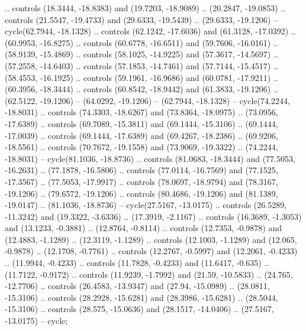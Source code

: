 {  .. controls (18.3444, -18.8383) and (19.7203, -18.9089) .. (20.2847, -19.0853)
  .. controls (21.5547, -19.4733) and (29.6333, -19.5439) .. (29.6333, -19.1206)
  -- cycle(62.7944, -18.1328)
  .. controls (62.1242, -17.6036) and (61.3128, -17.0392) .. (60.9953, -16.8275)
  .. controls (60.6778, -16.6511) and (59.7606, -16.0161) .. (58.9139, -15.4869)
  .. controls (58.1025, -14.9225) and (57.3617, -14.5697) .. (57.2558, -14.6403)
  .. controls (57.1853, -14.7461) and (57.7144, -15.4517) .. (58.4553, -16.1925)
  .. controls (59.1961, -16.9686) and (60.0781, -17.9211) .. (60.3956, -18.3444)
  .. controls (60.8542, -18.9442) and (61.3833, -19.1206) .. (62.5122, -19.1206)
  -- (64.0292, -19.1206)
  -- (62.7944, -18.1328)
  -- cycle(74.2244, -18.8031)
  .. controls (74.3303, -18.6267) and (73.8364, -18.0975) .. (73.0956, -17.6389)
  .. controls (69.7089, -15.3811) and (69.1444, -15.3106) .. (69.1444, -17.0039)
  .. controls (69.1444, -17.6389) and (69.4267, -18.2386) .. (69.9206, -18.5561)
  .. controls (70.7672, -19.1558) and (73.9069, -19.3322) .. (74.2244, -18.8031)
  -- cycle(81.1036, -18.8736)
  .. controls (81.0683, -18.3444) and (77.5053, -16.2631) .. (77.1878, -16.5806)
  .. controls (77.0114, -16.7569) and (77.1525, -17.3567) .. (77.5053, -17.9917)
  .. controls (78.0697, -18.9794) and (78.3167, -19.1206) .. (79.6572, -19.1206)
  .. controls (80.4686, -19.1206) and (81.1389, -19.0147) .. (81.1036, -18.8736)
  -- cycle(27.5167, -13.0175)
  .. controls (26.5289, -11.3242) and (19.3322, -3.6336) .. (17.3919, -2.1167)
  .. controls (16.3689, -1.3053) and (13.1233, -0.3881) .. (12.8764, -0.8114)
  .. controls (12.7353, -0.9878) and (12.4883, -1.1289) .. (12.3119, -1.1289)
  .. controls (12.1003, -1.1289) and (12.065, -0.9878) .. (12.1708, -0.7761)
  .. controls (12.2767, -0.5997) and (12.2061, -0.4233) .. (11.9944, -0.4233)
  .. controls (11.7828, -0.4233) and (11.6417, -0.635) .. (11.7122, -0.9172)
  .. controls (11.9239, -1.7992) and (21.59, -10.5833) .. (24.765, -12.7706)
  .. controls (26.4583, -13.9347) and (27.94, -15.0989) .. (28.0811, -15.3106)
  .. controls (28.2928, -15.6281) and (28.3986, -15.6281) .. (28.5044, -15.3106)
  .. controls (28.575, -15.0636) and (28.1517, -14.0406) .. (27.5167, -13.0175)
  -- cycle;
}
